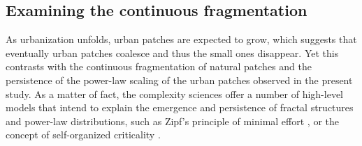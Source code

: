 \documentclass[10pt,letterpaper]{article}
\begin{document}
\subsection*{Examining the continuous fragmentation}

As urbanization unfolds, urban patches are expected to grow, which suggests that eventually urban patches coalesce and thus the small ones disappear. Yet this contrasts with the continuous fragmentation of natural patches and the persistence of the power-law scaling of the urban patches observed in the present study.
As a matter of fact, the complexity sciences offer a number of high-level models that intend to explain the emergence and persistence of fractal structures and power-law distributions, such as Zipf's principle of minimal effort \cite{zipf1949human}, or the concept of self-organized criticality \cite{bak1988self}.
\end{document}
